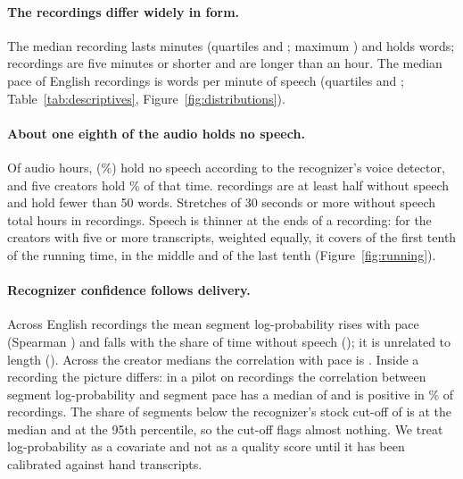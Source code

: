 \paragraph{The recordings differ widely in form.}
The median recording lasts \LenMed{} minutes (quartiles \LenQi{} and \LenQiii; maximum \LenMax) and holds \WordsMed{} words; \NLenUpToFive{} recordings are five minutes or shorter and \NLenOverSixty{} are longer than an hour. The median pace of English recordings is \PaceMed{} words per minute of speech (quartiles \PaceQi{} and \PaceQiii; Table~\ref{tab:descriptives}, Figure~\ref{fig:distributions}).

\paragraph{About one eighth of the audio holds no speech.}
Of \SnapHours{} audio hours, \SnapNonSpeechHours{} (\SnapNonSpeechPct\%) hold no speech according to the recognizer's voice detector, and five creators hold \NonSpTopFivePct\% of that time. \NHalfNonSpeech{} recordings are at least half without speech and \NUnderFiftyWords{} hold fewer than 50 words. Stretches of 30 seconds or more without speech total \QuietHours{} hours in \NQuietRecordings{} recordings. Speech is thinner at the ends of a recording: for the \SnapCreatorsFivePlus{} creators with five or more transcripts, weighted equally, it covers \CovSeenFirst{} of the first tenth of the running time, \CovSeenMiddle{} in the middle and \CovSeenLast{} of the last tenth (Figure~\ref{fig:running}).

\paragraph{Recognizer confidence follows delivery.}
Across \RhoN{} English recordings the mean segment log-probability rises with pace (Spearman \RhoLogpPace) and falls with the share of time without speech (\RhoLogpNonSp); it is unrelated to length (\RhoLogpLen). Across the \SnapCreatorsFivePlus{} creator medians the correlation with pace is \RhoCreatorLogpPace. Inside a recording the picture differs: in a pilot on \RhoWithinRecordings{} recordings the correlation between segment log-probability and segment pace has a median of \RhoWithinMed{} and is positive in \RhoWithinPositivePct\% of recordings. The share of segments below the recognizer's stock cut-off of \StockLogpCutoff{} is \ShareBelowCutoffMed{} at the median and \ShareBelowCutoffPninetyfive{} at the 95th percentile, so the cut-off flags almost nothing. We treat log-probability as a covariate and not as a quality score until it has been calibrated against hand transcripts.

